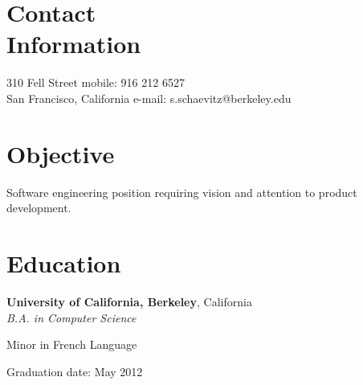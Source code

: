 \documentclass[margin,line]{resume}
\begin{document}
\begin{resume}

	\section{\mysidestyle Contact\\Information}

	310 Fell Street			\hfill mobile: 916 212 6527       		 \vspace{0mm}\\\vspace{0mm}%
	San Francisco, California       \hfill e-mail: s.schaevitz@berkeley.edu          \vspace{0mm}\\\vspace{-4.5mm}%

	\section{\mysidestyle Objective}
	Software engineering position requiring vision and attention to product development.

	\section{\mysidestyle Education}

	\textbf{University of California, Berkeley}, California \vspace{1mm}\\\vspace{0mm}%
	\textsl{B.A. in Computer Science} \hfill \textbf{}\vspace{-3mm}\\\vspace{-1mm}%
	\begin{list2}
		\item Minor in French Language
	\item Graduation date: May 2012
	\end{list2}\vspace{-1.5mm}



\end{resume}
\end{document}
